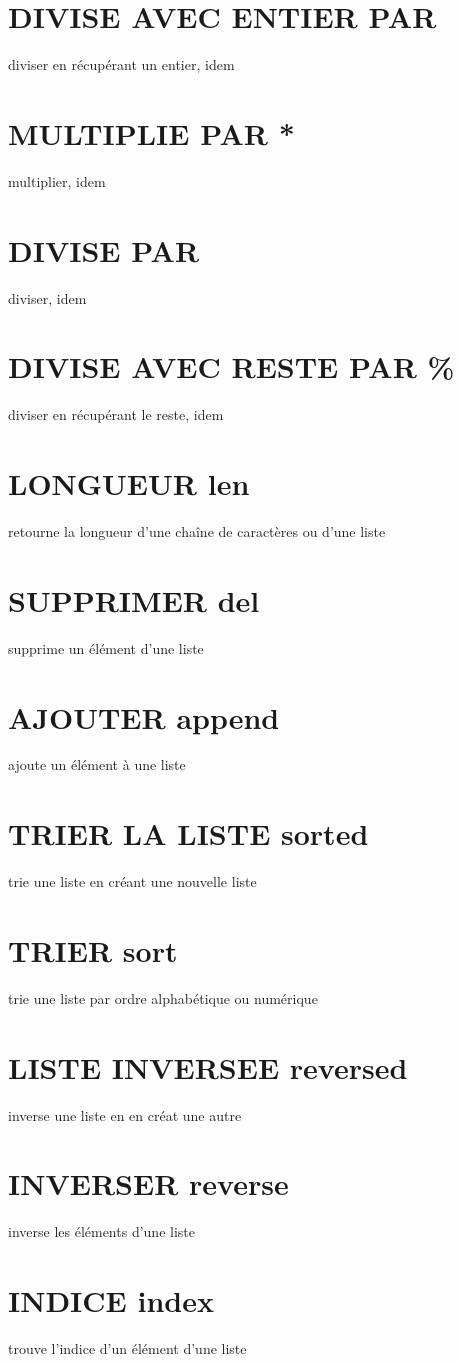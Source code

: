 \documentclass{book}
\begin{document}
\section{DIVISE AVEC ENTIER PAR \ \  }
  diviser en récupérant un entier, idem
\section{MULTIPLIE PAR * }
  multiplier, idem
\section{DIVISE PAR \  }
  diviser, idem
\section{DIVISE AVEC RESTE PAR \% }
  diviser en récupérant le reste, idem
\section{LONGUEUR len }
  retourne la longueur d'une chaîne de caractères ou d'une liste
\section{SUPPRIMER del }
  supprime un élément d'une liste
\section{AJOUTER append }
  ajoute un élément à une liste
\section{TRIER LA LISTE sorted }
  trie une liste en créant une nouvelle liste 
\section{TRIER sort }
  trie une liste par ordre alphabétique ou numérique
\section{LISTE INVERSEE reversed }
  inverse une liste en en créat une autre
\section{INVERSER reverse }
  inverse les éléments d'une liste
\section{INDICE index }
  trouve l'indice d'un élément d'une liste
\end{document}
